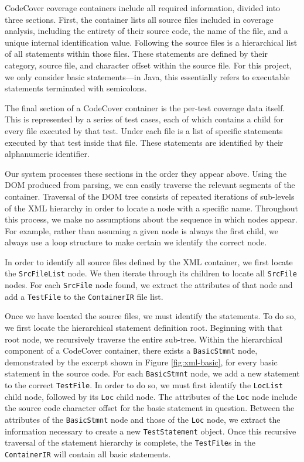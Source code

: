 CodeCover coverage containers include all required
information, divided into three sections.  First, the container lists all source
files included in coverage analysis, including the entirety of their source code,
the name of the file, and a unique internal identification value.  Following the source files
is a hierarchical list of all statements within those files.  These statements are defined by 
their category, source file, and character offset within the source file.  For this
project, we only consider basic statements---in Java, this essentially refers to executable
statements terminated with semicolons.  

The final section of a CodeCover container is the per-test coverage data itself.  This is
represented by a series of test cases, each of which contains a child for every file
executed by that test. Under each file is a list of specific statements executed by that
test inside that file.  These statements are identified by their alphanumeric identifier.

Our system processes these sections in the order they appear above.  Using the DOM produced
from parsing, we can easily traverse the relevant segments of the container.  Traversal of
the DOM tree consists of repeated iterations of sub-levels of the XML hierarchy in order
to locate a node with a specific name.  Throughout this process, we make no assumptions about
the sequence in which nodes appear.  For example, rather than assuming a given node is
always the first child, we always use a loop structure to make certain we identify the correct
node.

In order to identify all source files defined by the
XML container, we first locate the \texttt{SrcFileList} node.  We then iterate through its
children to locate all \texttt{SrcFile} nodes.  For each \texttt{SrcFile} node found, we 
extract the attributes of that node and add a \texttt{TestFile} to the \texttt{ContainerIR}
file list.  

Once we have located the source files, we must identify the statements.  To do so, we first
locate the hierarchical statement definition root.  Beginning with that root node, we recursively
traverse the entire sub-tree.  Within the hierarchical component of a CodeCover container, there
exists a \texttt{BasicStmnt} node, demonstrated by the excerpt shown in Figure \ref{fig:xml-basic}, for every basic statement in the source code.  For each \texttt{BasicStmnt} node, we add a new statement to the 
correct \texttt{TestFile}.  In order to do so, we must first identify the \texttt{LocList} child
node, followed by its \texttt{Loc} child node.  The attributes of the \texttt{Loc} node include
the source code character offset for the basic statement in question.  Between the attributes of
the \texttt{BasicStmnt} node and those of the \texttt{Loc} node, we extract the information
necessary to create a new \texttt{TestStatement} object.  Once this recursive traversal of the
statement hierarchy is complete, the \texttt{TestFile}s in the \texttt{ContainerIR} will contain
all basic statements.

